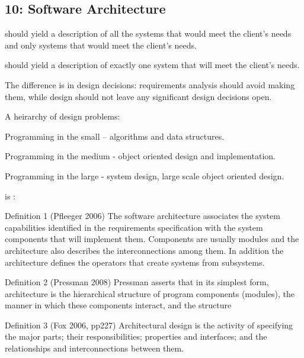 \begin{compactitem}
\begin{compactitem}
\end{compactitem}

\subsection{10: Software Architecture}
\begin{compactitem} 
\item {} should yield a description of all the systems that would meet the client’s needs and only systems that would meet the client’s needs. 
\item {} should yield a description of exactly one system that will meet the client’s needs.
\item The difference is in design decisions: requirements analysis should avoid making them, while design should not leave any significant design decisions open.
\item A heirarchy of design problems:
\begin{compactitem}
\item Programming in the small – algorithms and data structures.
\item Programming in the medium - object oriented design and implementation.
\item Programming in the large - system design, large scale object oriented design.
\end{compactitem}

\item {} is :
\begin{compactitem}
\item Definition 1 (Pfleeger 2006)
The software architecture associates the system capabilities identified in the requirements specification with the system components that will implement them. Components are usually modules and the architecture also describes the interconnections among them. In addition the architecture defines the operators that create systems from subsystems.
\item Definition 2 (Pressman 2008) 
Pressman asserts that in its simplest form, architecture is the hierarchical structure of program components (modules), the manner in which these components interact, and the structure
\item Definition 3 (Fox 2006, pp227) 
Architectural design is the activity of specifying the major parts; their responsibilities; properties and interfaces; and the relationships and interconnections between them. 
\end{compactitem}


\end{compactitem}
\end{compactitem}
